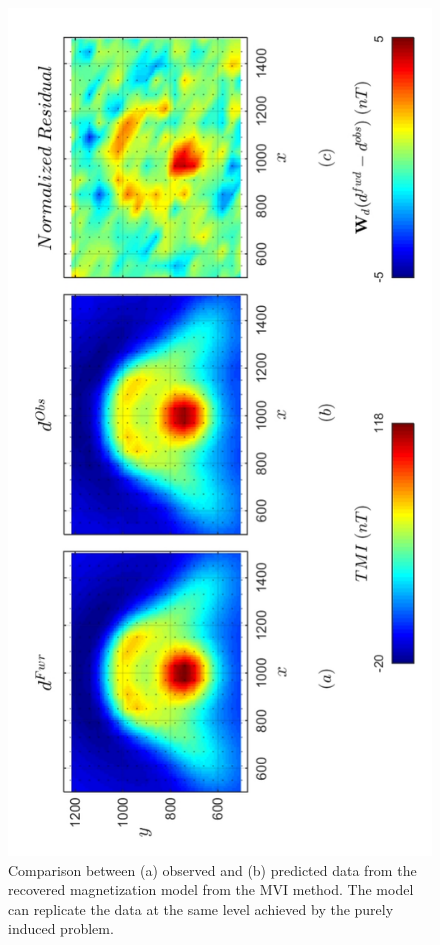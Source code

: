 \begin{figure}[h!]
\centering
\includegraphics[scale=0.52, angle =270]{3D_Inv_l2l2_pred_TMVI.pdf}
\caption{Comparison between (a) observed and (b) predicted data from the recovered magnetization model from the MVI method. The model can replicate the data at the same level achieved by the purely induced problem.}
\label{fig:3D_Inv_l2l2_pred_TMVI}
\end{figure}

